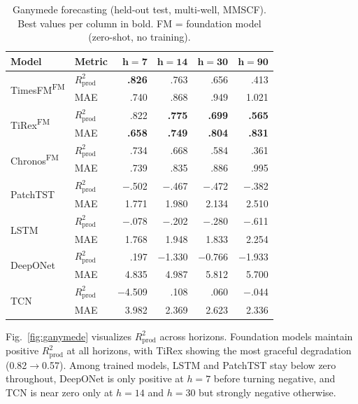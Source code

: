 \documentclass[conference]{IEEEtran}
\begin{document}
\begin{table}[t]
\centering
\caption{Ganymede forecasting (held-out test, multi-well, MMSCF). Best values per column in bold. FM = foundation model (zero-shot, no training).}
\label{tab:ganymede}
\small
\setlength{\tabcolsep}{2.5pt}
\begin{tabular}{@{}ll rrrr @{}}
\toprule
\textbf{Model} & \textbf{Metric} & $\boldsymbol{h{=}7}$ & $\boldsymbol{h{=}14}$ & $\boldsymbol{h{=}30}$ & $\boldsymbol{h{=}90}$ \\
\midrule
\multirow{2}{*}{TimesFM\textsuperscript{FM}}
 & $R^2_\text{prod}$ & \textbf{.826} & .763 & .656 & .413 \\
 & MAE              & .740 & .868 & .949 & 1.021 \\
\midrule
\multirow{2}{*}{TiRex\textsuperscript{FM}}
 & $R^2_\text{prod}$ & .822 & \textbf{.775} & \textbf{.699} & \textbf{.565} \\
 & MAE              & \textbf{.658} & \textbf{.749} & \textbf{.804} & \textbf{.831} \\
\midrule
\multirow{2}{*}{Chronos\textsuperscript{FM}}
 & $R^2_\text{prod}$ & .734 & .668 & .584 & .361 \\
 & MAE              & .739 & .835 & .886 & .995 \\
\midrule
\multirow{2}{*}{PatchTST}
 & $R^2_\text{prod}$ & $-$.502 & $-$.467 & $-$.472 & $-$.382 \\
 & MAE              & 1.771 & 1.980 & 2.134 & 2.510 \\
\midrule
\multirow{2}{*}{LSTM}
 & $R^2_\text{prod}$ & $-$.078 & $-$.202 & $-$.280 & $-$.611 \\
 & MAE              & 1.768 & 1.948 & 1.833 & 2.254 \\
\midrule
\multirow{2}{*}{DeepONet}
 & $R^2_\text{prod}$ & .197 & $-$1.330 & $-$0.766 & $-$1.933 \\
 & MAE              & 4.835 & 4.987 & 5.812 & 5.700 \\
\midrule
\multirow{2}{*}{TCN}
 & $R^2_\text{prod}$ & $-$4.509 & .108 & .060 & $-$.044 \\
 & MAE              & 3.982 & 2.369 & 2.623 & 2.336 \\
\bottomrule
\end{tabular}
\end{table}

Fig.~\ref{fig:ganymede} visualizes $R^2_\text{prod}$ across horizons. Foundation models maintain positive $R^2_\text{prod}$ at all horizons, with TiRex showing the most graceful degradation (0.82$\to$0.57). Among trained models, LSTM and PatchTST stay below zero throughout, DeepONet is only positive at $h{=}7$ before turning negative, and TCN is near zero only at $h{=}14$ and $h{=}30$ but strongly negative otherwise.
\end{document}

